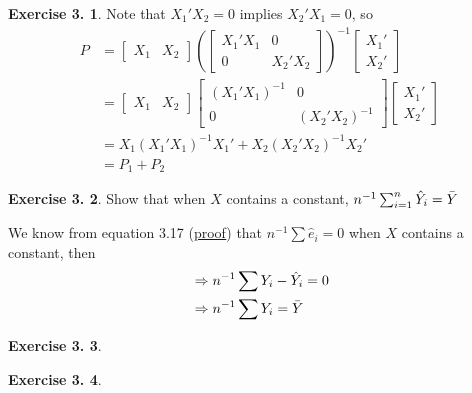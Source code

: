 \documentclass[12pt,letterpaper,reqno]{amsart}
\theoremstyle{plain}
\theoremstyle{definition}
\theoremstyle{definition}
\newtheorem{Exercise}{Exercise 3.}
\numberwithin{equation}{section}
\begin{document}
\begin{Exercise}
    Note that $X_1'X_2=0$ implies $X_2'X_1=0$, so
    \[\begin{split}
    P & = \begin{bmatrix} X_1 & X_2 \end{bmatrix} (\begin{bmatrix} X_1'X_1 & 0 \\ 0 & X_2'X_2 \end{bmatrix} )^{-1} \begin{bmatrix} X_1' \\ X_2' \end{bmatrix} \\
    & = \begin{bmatrix} X_1 & X_2 \end{bmatrix} \begin{bmatrix} (X_1'X_1)^{-1} & 0 \\ 0 & (X_2'X_2)^{-1} \end{bmatrix}  \begin{bmatrix} X_1' \\ X_2' \end{bmatrix} \\ 
    & = X_1(X_1'X_1)^{-1}X_1' + X_2(X_2'X_2)^{-1}X_2' \\ 
    & = P_1 + P_2
    \end{split}\]
\end{Exercise}

\begin{Exercise} Show that when $X$ contains a constant, $n^{-1}\sum_{i=1}^{n}\hat{Y}_i=\Bar{Y}$

We know from equation 3.17 (\href{https://math.stackexchange.com/a/2566727/984145}{proof}) that $n^{-1}\sum\hat{e}_i = 0 $ when $X$ contains a constant, then
\[\begin{split}
    & \Rightarrow n^{-1}\sum{Y}_i-\hat{Y}_i = 0 \\
    & \Rightarrow n^{-1}\sum{Y}_i = \Bar{Y}
\end{split} \]

\end{Exercise}

\begin{Exercise}
\end{Exercise}

\begin{Exercise}
\end{Exercise}
\end{document}
